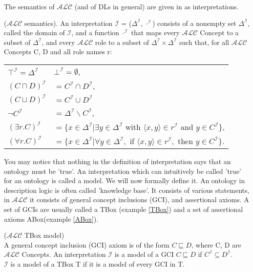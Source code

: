 The semantics of $\mathcal{ALC}$ (and of DLs in general) are given in as interpretations. 
\begin{mydef}
\label{ALCsemantics}
\cite{handbook2} 
($\mathcal{ALC}$ semantics). An interpretation $\mathcal{I}$ = ($\Delta ^\mathcal{I}$, $\cdot ^\mathcal{I}$) consists of a nonempty
set $\Delta ^\mathcal{I}$, called the domain of $\mathcal{I}$, and a function $\cdot ^\mathcal{I}$ that maps every $\mathcal{ALC}$ Concept
to a subset of $\Delta ^\mathcal{I}$, and every $\mathcal{ALC}$ role to a subset of $\Delta ^\mathcal{I} \times \Delta ^\mathcal{I}$ such that, for all $\mathcal{ALC}$ Concepts C, D and all role names r:\\
\begin{tabular}{l l}
 $\top ^\mathcal{I} = \Delta^\mathcal{I}$ & $\bot ^\mathcal{I} = \emptyset $, \\
$(C \sqcap D)^\mathcal{I}$ & $= C^\mathcal{I} \cap D^\mathcal{I}$,\\
 $(C \sqcup D) ^\mathcal{I}$ & $= C^\mathcal{I} \cup D^\mathcal{I}$\\
 $\neg C^\mathcal{I}$ & $= \Delta^\mathcal{I} \backslash C^\mathcal{I}$, \\
 $ (\exists r.C)^\mathcal{I}$ & $= \{x \in \Delta ^\mathcal{I} | \exists y \in \Delta ^\mathcal{I} $ with  $\langle x, y \rangle \in r^\mathcal{I}$ and $y \in C^\mathcal{I}\}$,\\
 $(\forall r.C)^\mathcal{I}$ & $= \{x \in \Delta ^\mathcal{I} | \forall y \in \Delta ^\mathcal{I},$ if $\langle x, y \rangle \in  r^\mathcal{I},$ then  $y \in C^\mathcal{I}\}$.\\
\end{tabular}
\end{mydef}
You may notice that nothing in the definition of interpretation says that an ontology must be 'true'. An interpretation which can intuitively be called 'true' for an ontology is called a model. We will now formally define it.
An ontology in description logic is often called 'knowledge base'. It consists of various statements, in $\mathcal{ALC}$ it consists of general concept inclusions (GCI), and assertional axioms. A set of GCIs are usually called a TBox (example \ref{TBox}) and a set of assertional axioms ABox(example \ref{ABox}).
\begin{mydef}\label{ALCTbox} \cite{handbook2} ($\mathcal{ALC}$ TBox model)\\
A general concept inclusion (GCI) axiom is of the form $C \sqsubseteq D$, where C, D
are $\mathcal{ALC}$ Concepts. An interpretation $\mathcal{I}$ is a model
of a GCI $C \sqsubseteq D$ if $C^\mathcal{I} \subseteq D^\mathcal{I}$.\\ $\mathcal{I}$ is a model of a TBox T if it is a model of every GCI
in T. \\
\end{mydef}
